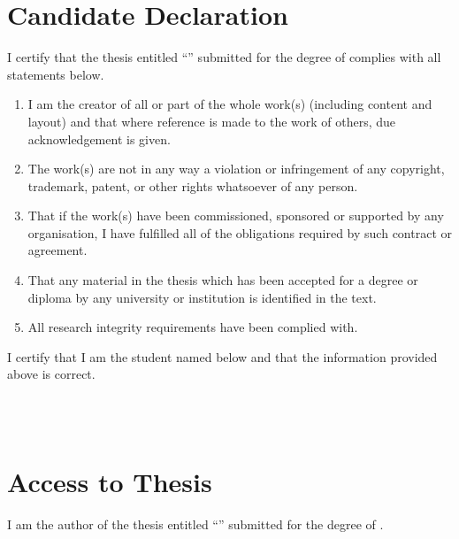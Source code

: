 
\cleardoubleevenemptypage
{}
{}
\chapter*{Candidate Declaration}
I certify that the thesis entitled ``\textit{\thetitle{}}'' submitted for the degree of \thedegree{} complies with all statements below.\bigskip
\begin{enumerate}[label=(\roman*)]
  \item I am the creator of all or part of the whole work(s) (including content and layout) and that where reference is made to the work of others, due acknowledgement is given.    
  \item The work(s) are not in any way a violation or infringement of any copyright, trademark, patent, or other rights whatsoever of any person.
  \item That if the work(s) have been commissioned, sponsored or supported by any organisation, I have fulfilled all of the obligations required by such contract or agreement.
  \item That any material in the thesis which has been accepted for a degree or diploma by any university or institution is identified in the text.
  \item All research integrity requirements have been complied with.
\end{enumerate}\bigskip
I certify that I am the student named below and that the information provided above is correct.

\vspace{2cm}
\noindent
\hspace{\fill}
\parbox[b]{0.4\linewidth}{
  \raggedleft
  \ifdefined{}\else\fi
  
  \vspace{-6mm}
  \hrulefill\\
  \theauthor{}\\
  \footnotesize
  \thedate{}
}

\cleardoubleevenemptypage
{}
{}
\chapter*{Access to Thesis}
I am the author of the thesis entitled ``\textit{\thetitle{}}'' submitted for the degree of \thedegree{}.
\bigskip

